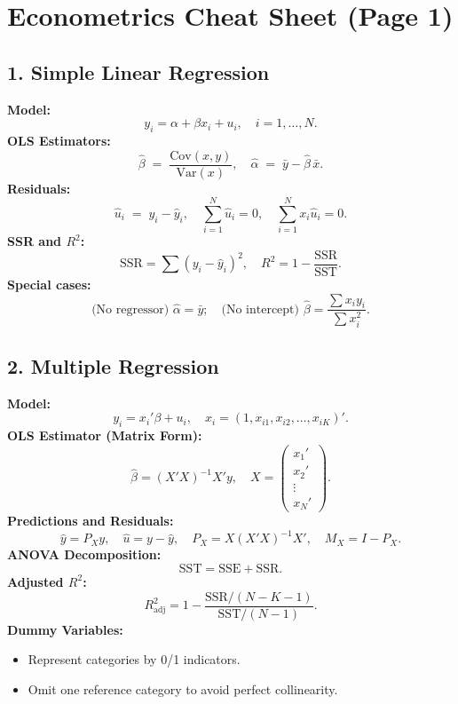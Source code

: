 \documentclass[a4paper,10pt]{article}
\begin{document}
\section*{\centering Econometrics Cheat Sheet (Page 1)}

\subsection*{1. Simple Linear Regression}
\textbf{Model:} 
\[
y_i = \alpha + \beta x_i + u_i, \quad i = 1,\ldots,N.
\]
\textbf{OLS Estimators:}
\[
\hat{\beta} \;=\; \frac{\mathrm{Cov}(x,y)}{\mathrm{Var}(x)}, 
\quad 
\hat{\alpha} \;=\; \bar{y} - \hat{\beta}\,\bar{x}.
\]
\textbf{Residuals:} 
\[
\hat{u}_i \;=\; y_i - \hat{y}_i,\quad 
\sum_{i=1}^{N}\hat{u}_i = 0,\quad
\sum_{i=1}^{N} x_i\hat{u}_i = 0.
\]
\textbf{SSR and $R^2$:}
\[
\mathrm{SSR} = \sum (y_i - \hat{y}_i)^2,\quad
R^2 = 1 - \frac{\mathrm{SSR}}{\mathrm{SST}}.
\]
\textbf{Special cases:}
\[
\text{(No regressor) } \hat{\alpha} = \bar{y}; 
\quad
\text{(No intercept) } \hat{\beta} = \frac{\sum x_i y_i}{\sum x_i^2}.
\]

\subsection*{2. Multiple Regression}
\textbf{Model:}
\[
y_i = x_i'\beta + u_i,\quad x_i = (1, x_{i1}, x_{i2},\ldots, x_{iK})'.
\]
\textbf{OLS Estimator (Matrix Form):}
\[
\hat{\beta} = (X'X)^{-1} X'y, \quad 
X = 
\begin{pmatrix}
x_1' \\
x_2' \\
\vdots \\
x_N'
\end{pmatrix}.
\]
\textbf{Predictions and Residuals:}
\[
\hat{y} = P_X y,\quad \hat{u} = y - \hat{y}, \quad 
P_X = X(X'X)^{-1}X',\quad M_X = I - P_X.
\]
\textbf{ANOVA Decomposition:}
\[
\mathrm{SST} = \mathrm{SSE} + \mathrm{SSR}.
\]
\textbf{Adjusted $R^2$:}
\[
R^2_{\text{adj}} 
= 1 - 
\frac{\mathrm{SSR}/(N - K - 1)}{\mathrm{SST}/(N - 1)}.
\]
\textbf{Dummy Variables:}
\begin{itemize}
\item Represent categories by 0/1 indicators.
\item Omit one reference category to avoid perfect collinearity.
\end{itemize}
\end{document}
